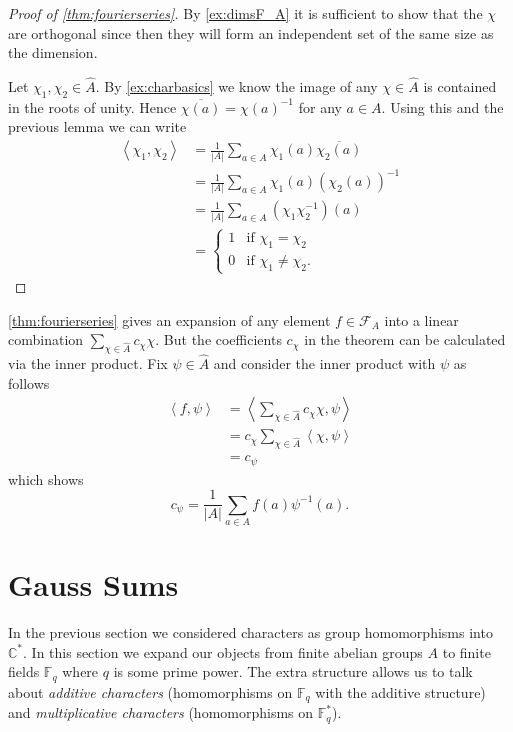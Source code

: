 \documentclass[11pt]{article}
\newcommand{\BB}[1]{\mathbb{#1}} %
\newcommand{\script}[1]{\mathcal{#1}} %
\newcommand{\free}[1]{\left\langle#1\right\rangle} %
\newcommand{\CC}{\BB{C}}
\newcommand{\FF}{\BB{F}}
\newcommand{\sF}{\script{F}}
\renewcommand{\hat}{\widehat}
\theoremstyle{plain}
\theoremstyle{definition}
\theoremstyle{remark}
\begin{document}
\begin{proof}[Proof of \autoref{thm:fourierseries}]
	By \autoref{ex:dimsF_A} it is sufficient to show that the $\chi$ are orthogonal since then they will form an independent set of the same size as the dimension.

	Let $\chi_1,\chi_2\in\hat{A}$. By \autoref{ex:charbasics} we know the image of any $\chi\in\hat{A}$ is contained in the roots of unity. Hence $\overline{\chi(a)} = \chi(a)^{-1}$ for any $a\in A$. Using this and the previous lemma we can write
	\begin{align*}
		\free{\chi_1,\chi_2} &= \frac{1}{|A|}\sum_{a\in A}\chi_1(a)\overline{\chi_2(a)}
		\\
		&= \frac{1}{|A|}\sum_{a\in A}\chi_1(a)\left(\chi_2(a)\right)^{-1}
		\\
		&= \frac{1}{|A|}\sum_{a\in A}\left(\chi_1\chi_2^{-1}\right)(a)
		\\
		&=
		\begin{cases}
			1 &\text{if $\chi_1=\chi_2$}
			\\
			0 &\text{if $\chi_1\neq\chi_2$.}
		\end{cases}
	\end{align*}
\end{proof}

\autoref{thm:fourierseries} gives an expansion of any element $f\in\sF_A$ into a linear combination $\sum_{\chi\in\hat{A}}c_\chi\chi$. But the coefficients $c_\chi$ in the theorem can be calculated via the inner product. Fix $\psi\in\hat{A}$ and consider the inner product with $\psi$ as follows
\begin{align*}
	\free{f,\psi} &= \free{\sum_{\chi\in\hat{A}}c_\chi\chi,\psi}
	\\
	&= c_\chi\sum_{\chi\in\hat{A}}\free{\chi,\psi}
	\\
	&= c_\psi
\end{align*}
which shows
\begin{equation}
	c_\psi = \frac{1}{|A|}\sum_{a\in A}f(a)\psi^{-1}(a).
\end{equation}

\section{Gauss Sums}
\hfill

In the previous section we considered characters as group homomorphisms into $\CC^*$. In this section we expand our objects from finite abelian groups $A$ to finite fields $\FF_q$ where $q$ is some prime power. The extra structure allows us to talk about \emph{additive characters} (homomorphisms on $\FF_q$ with the additive structure) and \emph{multiplicative characters} (homomorphisms on $\FF_q^*$).
\end{document}
